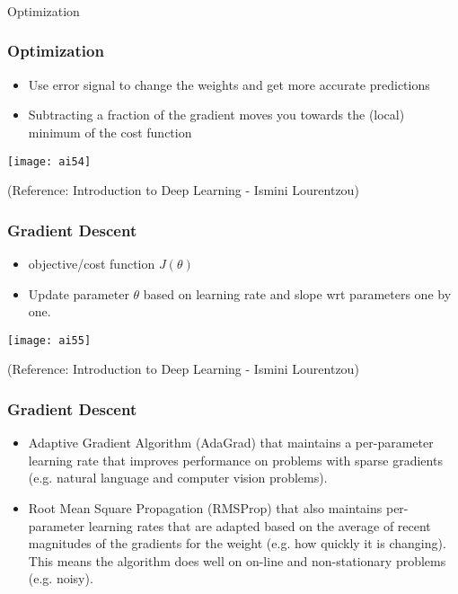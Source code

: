 \begin{frame}[fragile]\frametitle{}
\begin{center}
{\Large Optimization}
\end{center}
\end{frame}


\begin{frame}[fragile] \frametitle{Optimization}
\begin{itemize}
\item Use error signal to change the weights and get more accurate predictions 
\item Subtracting a fraction of the gradient moves you towards the (local) minimum of the cost function
\end{itemize}
\begin{center}
\texttt{[image: ai54]}
\end{center}
\tiny{(Reference: Introduction to Deep Learning - Ismini Lourentzou)}
\end{frame}

\begin{frame}[fragile] \frametitle{Gradient Descent}
\begin{itemize}
\item objective/cost function $J(\theta)$
\item Update parameter $\theta$ based on learning rate and slope wrt parameters one by one.
\end{itemize}
\begin{center}
\texttt{[image: ai55]}
\end{center}
\tiny{(Reference: Introduction to Deep Learning - Ismini Lourentzou)}
\end{frame}

\begin{frame}[fragile] \frametitle{Gradient Descent}

\begin{itemize}
\item Adaptive Gradient Algorithm (AdaGrad) that maintains a per-parameter learning rate that improves performance on problems with sparse gradients (e.g. natural language and computer vision problems).
\item Root Mean Square Propagation (RMSProp) that also maintains per-parameter learning rates that are adapted based on the average of recent magnitudes of the gradients for the weight (e.g. how quickly it is changing). This means the algorithm does well on on-line and non-stationary problems (e.g. noisy).
\end{itemize}
\end{frame}


